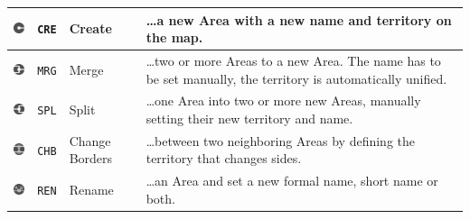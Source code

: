 \vspace{0.5em}
\begin{table}[H]
\begin{center}
\begin{tabular}{m{0.75cm} m{0.8cm} m{2.4cm} m{9.1cm}}
  \toprule

  \raisebox{-0.35\height}
  {\includegraphics[width=0.72cm]{graphics/development/editing_hivent_data/edit_operations/CRE}} &
  \texttt{CRE} & Create &
  \dots a new Area with a new name and territory on the map. \\

  \midrule
  \raisebox{-0.35\height}
  {\includegraphics[width=0.72cm]{graphics/development/editing_hivent_data/edit_operations/MRG}} &
  \texttt{MRG} & Merge &
  \dots two or more Areas to a new Area. The name has to be set manually, the territory is automatically unified. \\

  \midrule
  \raisebox{-0.35\height}
  {\includegraphics[width=0.72cm]{graphics/development/editing_hivent_data/edit_operations/SPL}} &
  \texttt{SPL} & Split &
  \dots one Area into two or more new Areas, manually setting their new territory and name. \\

  \midrule
  \raisebox{-0.35\height}
  {\includegraphics[width=0.72cm]{graphics/development/editing_hivent_data/edit_operations/CHB}} &
  \texttt{CHB} & Change Borders &
  \dots between two neighboring Areas by defining the territory that changes sides. \\

  \midrule
  \raisebox{-0.35\height}
  {\includegraphics[width=0.72cm]{graphics/development/editing_hivent_data/edit_operations/REN}} &
  \texttt{REN} & Rename &
  \dots an Area and set a new formal name, short name or both. \\


\end{tabular}
\end{center}
\end{table}

